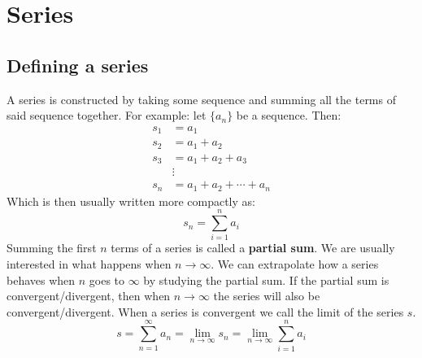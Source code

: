 \documentclass[11pt, a4paper]{article}
\begin{document}
\setcounter{section}{1}

\section{Series}


\subsection{Defining a series}
A series is constructed by taking some sequence and summing all the terms of said sequence together. For example: let $\{ a_n \}$ be a sequence. Then:
\begin{align*}
  s_1 &= a_1\\
  s_2 &= a_1 + a_2\\
  s_3 &= a_1 + a_2 + a_3\\
  &\vdots\\
  s_n &= a_1 + a_2 + \cdots + a_n
\end{align*}
Which is then usually written more compactly as:
\begin{equation*}
  s_n = \sum_{i=1}^{n} a_i
\end{equation*}
Summing the first $n$ terms of a series is called a \textbf{partial sum}. We are usually interested in what happens when $n\to \infty$. We can extrapolate how a series behaves when $n$ goes to $\infty$ by studying the partial sum. If the partial sum is convergent/divergent, then when $n\to \infty$ the series will also be convergent/divergent. When a series is convergent we call the limit of the series $s$.
\begin{equation*}
  s = \sum_{n=1}^{\infty} a_n = \lim_{n\to\infty} s_n = \lim_{n\to\infty} \sum_{i=1}^{n} a_i
\end{equation*}
\end{document}
